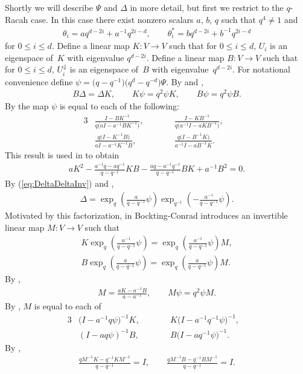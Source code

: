 \documentclass[pdftex]{sigma}
\numberwithin{equation}{section}
\begin{document}
Shortly we will describe $\Psi$ and $\Delta$ in more detail,
but first we restrict to the $q$-Racah case.
In this case there exist nonzero scalars $a$, $b$, $q$ such that $q^4 \not=1$ and
\begin{gather*}
\theta_i = a q^{d-2i}+ a^{-1} q^{2i-d}, \qquad
\theta^*_i = b q^{d-2i}+ b^{-1} q^{2i-d}
\end{gather*}
for $0 \leq i \leq d$.
Define a linear map $K\colon V\to V$
such that for $0 \leq i \leq d$, $U_i$ is an eigenspace of~$K$ with eigenvalue $q^{d-2i}$.
Define a linear map $B\colon V\to V$
such that for $0 \leq i \leq d$, $U^\Downarrow_i$ is an eigenspace of~$B$ with eigenvalue~$q^{d-2i}$. For notational convenience
define $\psi = \big(q-q^{-1}\big)\big(q^d-q^{-d}\big)\Psi$.
By \cite[Lemma~5.3]{bocktingQexp}
and \cite[Lemma~5.4]{bockting},
\begin{gather*}
B\Delta=\Delta K,
\qquad
K \psi = q^2 \psi K,
\qquad
B \psi = q^2 \psi B.
\end{gather*}
By \cite[Theorem~9.8]{bockting} the map $\psi$ is equal to
each of the following:
\begin{alignat*}{3}
& \frac{I - BK^{-1}}{q\big(aI - a^{-1}BK^{-1}\big)}, \qquad&&
\frac{I - KB^{-1}}{q\big(a^{-1}I - aKB^{-1}\big)},&\\
& \frac{q\big(I - K^{-1}B\big)}{aI - a^{-1}K^{-1}B}, \qquad&&
\frac{q\big(I - B^{-1}K\big)}{a^{-1}I - aB^{-1}K}.&
\end{alignat*}
This result is used in
\cite[Theorem~9.9]{bockting}
to obtain
\begin{gather*}
a K^2 -
\frac{a^{-1}q-aq^{-1}}{q-q^{-1}}KB
-
\frac{aq-a^{-1}q^{-1}}{q-q^{-1}}BK
+ a^{-1}B^2=0.
\end{gather*}
By
(\ref{eq:DeltaDeltaInv}) and
\cite[Theorem~7.2]{bocktingQexp},
\begin{gather*}
\Delta = \exp_q \left( \frac{a}{q-q^{-1}}\psi \right)
\exp_{q^{-1}} \left( - \frac{a^{-1}}{q-q^{-1}}\psi \right).
\end{gather*}
Motivated by this factorization, in \cite[Sections~6,7]{bocktingQexp}
Bockting-Conrad introduces an invertible linear map $M\colon V\to V$ such that
\begin{gather*}
K \exp_q \left( \frac{a^{-1}}{q-q^{-1}}\psi \right)
=\exp_{q} \left( \frac{a^{-1}}{q-q^{-1}}\psi \right) M,
\\
B \exp_q \left( \frac{a}{q-q^{-1}}\psi \right)
=
\exp_{q} \left( \frac{a}{q-q^{-1}}\psi \right) M.
\end{gather*}
By \cite[Section~6]{bocktingQexp},
\begin{gather*}
M = \frac{a K-a^{-1}B}{a-a^{-1}},
 \qquad
M \psi = q^2 \psi M.
\end{gather*}
By \cite[Lemma~6.2]{bocktingQexp},
 $M$ is equal to each of
\begin{alignat*}{3}
&\big(I-a^{-1}q\psi\big)^{-1}K, \qquad&& K\big(I-a^{-1}q^{-1}\psi\big)^{-1},&
\\ & (I-aq\psi)^{-1}B, \qquad&&
B\big(I-aq^{-1}\psi\big)^{-1}.&
\end{alignat*}
By \cite[Lemma~6.7]{bocktingQexp},
\begin{gather*}
\frac{q M^{-1}K-q^{-1}K M^{-1}}{q-q^{-1}} = I,
\qquad
\frac{q M^{-1}B-q^{-1}B M^{-1}}{q-q^{-1}} = I.
\end{gather*}
\end{document}
